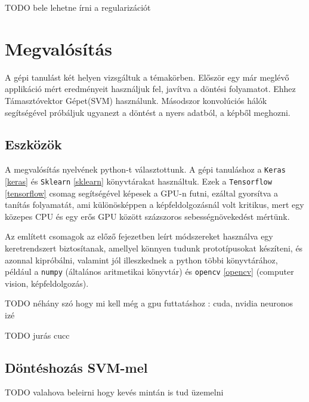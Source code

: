 TODO bele lehetne írni a regularizációt










\newpage
\section{Megvalósítás}

A gépi tanulást két helyen vizsgáltuk a témakörben.
Először egy már meglévő applikáció mért eredményeit használjuk fel,
javítva a döntési folyamatot. Ehhez Támasztóvektor Gépet(SVM) használunk.
Másodszor konvolúciós hálók segítségével próbáljuk ugyanezt a döntést 
a nyers adatból, a képből meghozni. 

\subsection{Eszközök}

A megvalósítás nyelvének python-t választottunk.
A gépi tanuláshoz a \texttt{Keras} \ref{keras} és \texttt{Sklearn} \ref{sklearn} könyvtárakat 
használtuk. Ezek a \texttt{Tensorflow} \ref{tensorflow} csomag segítségével képesek a
GPU-n futni, ezáltal gyorsítva a tanítás folyamatát, ami különösképpen a 
képfeldolgozásnál volt kritikus, mert egy közepes CPU és egy erős GPU között
százszoros sebességnövekedést mértünk.

Az említett csomagok az előző fejezetben leírt módszereket használva egy
keretrendszert biztosítanak, amellyel könnyen tudunk prototípusokat készíteni,
és azonnal kipróbálni, valamint jól illeszkednek a python többi könyvtárához,
például a \texttt{numpy} (általános aritmetikai könyvtár) és \texttt{opencv} \ref{opencv}
(computer vision, képfeldolgozás).



TODO néhány szó hogy mi kell még a gpu futtatáshoz : cuda, nvidia neuronos izé


TODO jurás cucc



\subsection{Döntéshozás SVM-mel}






TODO valahova beleirni hogy kevés mintán is tud üzemelni

